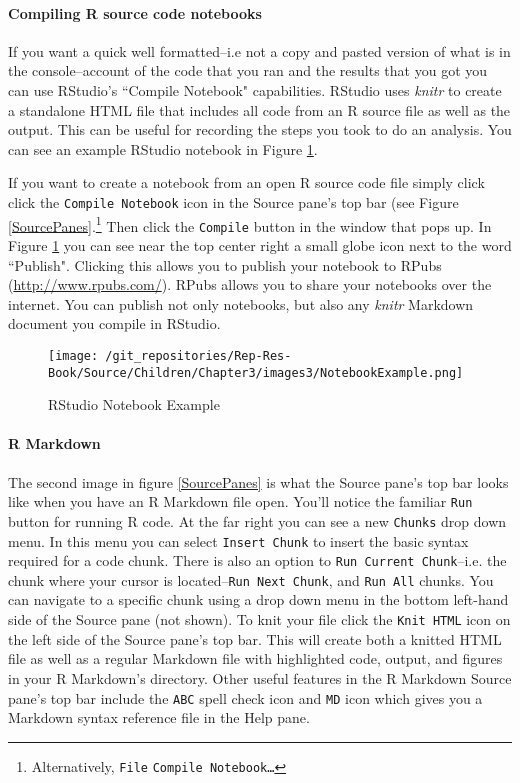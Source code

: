 \documentclass[ChapterTOCs,krantz1]{krantz}\usepackage{graphicx, color}
\begin{document}
{{\paragraph{Compiling R source code notebooks}

If you want a quick well formatted--i.e not a copy and pasted version of what is in the console--account of the code that you ran and the results that you got you can use RStudio's ``Compile Notebook" capabilities. RStudio uses {\emph{knitr}} to create a standalone HTML file that includes all code from an R source file as well as the output. This can be useful for recording the steps you took to do an analysis. You can see an example RStudio notebook in Figure \ref{NotebookExample}. 

If you want to create a notebook from an open R source code file simply click click the \texttt{Compile Notebook} icon in the Source pane's top bar (see Figure \ref{SourcePanes}.\footnote{Alternatively, \texttt{File} \textrightarrow \; \texttt{Compile Notebook\ldots}} Then click the \texttt{Compile} button in the window that pops up. In Figure \ref{NotebookExample} you can see near the top center right a small globe icon next to the word ``Publish". Clicking this allows you to publish your notebook to RPubs (\url{http://www.rpubs.com/}). RPubs allows you to share your notebooks over the internet. You can publish not only notebooks, but also any {\emph{knitr}} Markdown document you compile in RStudio.

\begin{figure}
    \caption{RStudio Notebook Example}
    \label{NotebookExample}
    \begin{center}
    
\texttt{[image: /git\_repositories/Rep-Res-Book/Source/Children/Chapter3/images3/NotebookExample.png]}
    \end{center}
\end{figure}

\paragraph{R Markdown} The second image in figure \ref{SourcePanes} is what the Source pane's top bar looks like when you have an R Markdown file open. You'll notice the familiar \texttt{Run} button for running R code. At the far right you can see a new \texttt{Chunks} drop down menu. In this menu you can select \texttt{Insert Chunk} to insert the basic syntax required for a code chunk. There is also an option to \texttt{Run Current Chunk}--i.e. the chunk where your cursor is located--\texttt{Run Next Chunk}, and \texttt{Run All} chunks. You can navigate to a specific chunk using a drop down menu in the bottom left-hand side of the Source pane (not shown). To knit your file click the \texttt{Knit HTML} icon on the left side of the Source pane's top bar. This will create both a knitted HTML file as well as a regular Markdown file with highlighted code, output, and figures in your R Markdown's directory. Other useful features in the R Markdown Source pane's top bar include the \texttt{ABC} spell check icon and \texttt{MD} icon which gives you a Markdown syntax reference file in the Help pane.

}}
\end{document}
